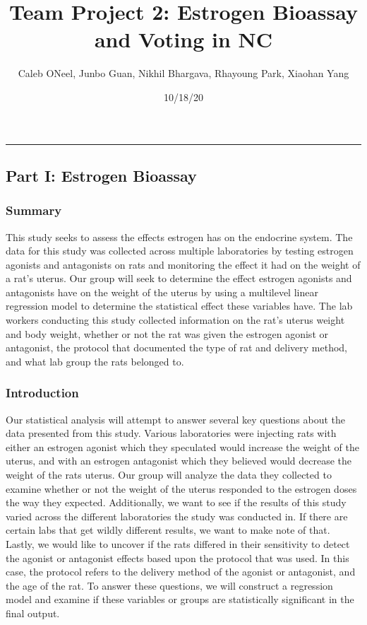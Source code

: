 \documentclass[
]{article}
\title{Team Project 2: Estrogen Bioassay and Voting in NC}
\author{Caleb ONeel, Junbo Guan, Nikhil Bhargava, Rhayoung Park, Xiaohan
Yang}
\date{10/18/20}
\begin{document}
\maketitle

\begin{center}\rule{0.5\linewidth}{0.5pt}\end{center}

\hypertarget{part-i-estrogen-bioassay}{%
\subsection{Part I: Estrogen Bioassay}\label{part-i-estrogen-bioassay}}

\hypertarget{summary}{%
\subsubsection{Summary}\label{summary}}

This study seeks to assess the effects estrogen has on the endocrine
system. The data for this study was collected across multiple
laboratories by testing estrogen agonists and antagonists on rats and
monitoring the effect it had on the weight of a rat's uterus. Our group
will seek to determine the effect estrogen agonists and antagonists have
on the weight of the uterus by using a multilevel linear regression
model to determine the statistical effect these variables have. The lab
workers conducting this study collected information on the rat's uterus
weight and body weight, whether or not the rat was given the estrogen
agonist or antagonist, the protocol that documented the type of rat and
delivery method, and what lab group the rats belonged to.

\hypertarget{introduction}{%
\subsubsection{Introduction}\label{introduction}}

Our statistical analysis will attempt to answer several key questions
about the data presented from this study. Various laboratories were
injecting rats with either an estrogen agonist which they speculated
would increase the weight of the uterus, and with an estrogen antagonist
which they believed would decrease the weight of the rats uterus. Our
group will analyze the data they collected to examine whether or not the
weight of the uterus responded to the estrogen doses the way they
expected. Additionally, we want to see if the results of this study
varied across the different laboratories the study was conducted in. If
there are certain labs that get wildly different results, we want to
make note of that. Lastly, we would like to uncover if the rats differed
in their sensitivity to detect the agonist or antagonist effects based
upon the protocol that was used. In this case, the protocol refers to
the delivery method of the agonist or antagonist, and the age of the
rat. To answer these questions, we will construct a regression model and
examine if these variables or groups are statistically significant in
the final output.
\end{document}
